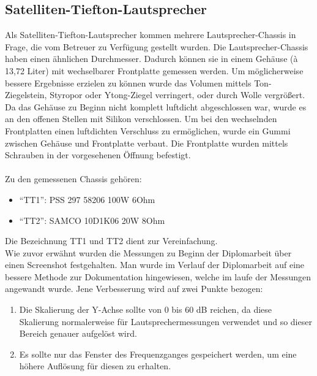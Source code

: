 \subsection*{Satelliten-Tiefton-Lautsprecher} \label{4.2.4}
Als Satelliten-Tiefton-Lautsprecher kommen mehrere Lautsprecher-Chassis in Frage, die vom Betreuer zu Verfügung gestellt wurden.
Die Lautsprecher-Chassis haben einen ähnlichen Durchmesser.
Dadurch können sie in einem Gehäuse (à 13,72 Liter) mit wechselbarer Frontplatte gemessen werden.
Um möglicherweise bessere Ergebnisse erzielen zu können wurde das Volumen mittels Ton-Ziegelstein, Styropor oder Ytong-Ziegel verringert, oder durch Wolle vergrößert.\\
Da das Gehäuse zu Beginn nicht komplett luftdicht abgeschlossen war, wurde es an den offenen Stellen mit Silikon verschlossen.
Um bei den wechselnden Frontplatten einen luftdichten Verschluss zu ermöglichen, wurde ein Gummi zwischen Gehäuse und Frontplatte verbaut.
Die Frontplatte wurden mittels Schrauben in der vorgesehenen Öffnung befestigt.\\ \\
Zu den gemessenen Chassis gehören:
\begin{itemize}
	\item \enquote{TT1}: PSS 297 58206 100W 6Ohm
	\item \enquote{TT2}: SAMCO 10D1K06 20W 8Ohm
\end{itemize}
Die Bezeichnung TT1 und TT2 dient zur Vereinfachung.\\

Wie zuvor erwähnt wurden die Messungen zu Beginn der Diplomarbeit über einen Screenshot festgehalten.
Man wurde im Verlauf der Diplomarbeit auf eine bessere Methode zur Dokumentation hingewiesen, welche im laufe der Messungen angewandt wurde.
Jene Verbesserung wird auf zwei Punkte bezogen:\\
\begin{enumerate}
	\item Die Skalierung der Y-Achse sollte von 0 bis 60 dB reichen, da diese Skalierung normalerweise für Lautsprechermessungen verwendet und so dieser Bereich genauer aufgelöst wird.
	\item Es sollte nur das Fenster des Frequenzganges gespeichert werden, um eine höhere Auflösung für diesen zu erhalten.
\end{enumerate}

